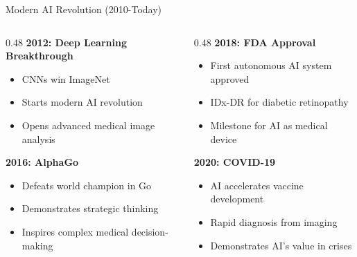 \documentclass[aspectratio=169, 10pt]{beamer}
\begin{document}
\begin{frame}{Modern AI Revolution (2010-Today)}

    \begin{columns}
        \begin{column}{0.48\textwidth}
            \textbf{2012: Deep Learning Breakthrough}
            \begin{itemize}
                \item CNNs win ImageNet
                \item Starts modern AI revolution
                \item Opens advanced medical image analysis
            \end{itemize}

            \vspace{2mm}
            \textbf{2016: AlphaGo}
            \begin{itemize}
                \item Defeats world champion in Go
                \item Demonstrates strategic thinking
                \item Inspires complex medical decision-making
            \end{itemize}
        \end{column}

        \begin{column}{0.48\textwidth}
            \textbf{2018: FDA Approval}
            \begin{itemize}
                \item First autonomous AI system approved
                \item IDx-DR for diabetic retinopathy
                \item Milestone for AI as medical device
            \end{itemize}

            \vspace{2mm}
            \textbf{2020: COVID-19}
            \begin{itemize}
                \item AI accelerates vaccine development
                \item Rapid diagnosis from imaging
                \item Demonstrates AI's value in crises
            \end{itemize}


\end{column}
\end{columns}
\end{frame}
\end{document}
